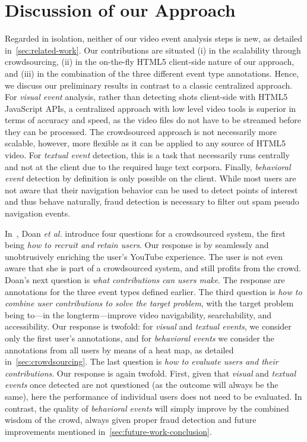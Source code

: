 \documentclass[runningheads,a4paper]{llncs}
\begin{document}
\section{Discussion of our Approach}
Regarded in isolation, neither of our video event analysis steps is new, as detailed in~\autoref{sec:related-work}. Our contributions are situated (i) in the scalability through crowdsourcing, (ii) in the on-the-fly HTML5 client-side nature of our approach, and (iii) in the combination of the three different event type annotations. Hence, we discuss our preliminary results in contrast to a classic centralized approach. For \emph{visual event} analysis, rather than detecting shots client-side with HTML5 Java\-Script APIs, a centralized approach with low level video tools is superior in terms of accuracy and speed, as the video files do not have to be streamed before they can be processed. The crowdsourced approach is not necessarily more scalable, however, more flexible as it can be applied to any source of HTML5 video. For \emph{textual event} detection, this is a task that necessarily runs centrally and not at the client due to the required huge text corpora. Finally, \emph{behavioral event} detection by definition is only possible on the client. While most users are not aware that their navigation behavior can be used to detect points of interest and thus behave naturally, fraud detection is necessary to filter out spam pseudo navigation events.

In~\cite{Doan:2011}, Doan \emph{et al.} introduce four questions for a crowdsourced system, the first being \textit{how to recruit and retain users}. Our response is by seamlessly and unobtrusively enriching the user's YouTube experience. The user is not even aware that she is part of a crowdsourced system, and still profits from the crowd. Doan's next question is \textit{what contributions can users make}. The response are annotations for the three event types defined earlier. The third question is \textit{how to combine user contributions to solve the target problem}, with the target problem being to---in the longterm---improve video navigability, searchability, and accessibility.  Our response is twofold: for \emph{visual} and \emph{textual events}, we consider only the first user's annotations, and for \emph{behavioral events} we consider the annotations from all users by means of a heat map, as detailed in~\autoref{sec:crowdsourcing}. The last question is \textit{how to evaluate users and their contributions}. Our response is again twofold. First, given that \emph{visual} and \emph{textual events} once detected are not questioned (as the outcome will always be the same), here the performance of individual users does not need to be evaluated. In contrast, the quality of \emph{behavioral events}  will simply improve by the combined wisdom of the crowd, always given proper fraud detection and future improvements mentioned in~\autoref{sec:future-work-conclusion}.
\end{document}
